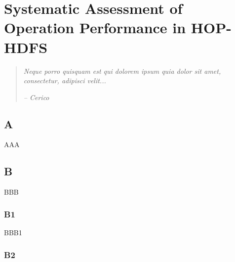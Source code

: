 
%
%
%


\chapter{Systematic Assessment of Operation Performance in HOP-HDFS}
\label{ch:Assessment}

\begin{quotation}
  {\small\it Neque porro quisquam est qui dolorem ipsum quia dolor sit amet, consectetur, adipisci velit...}

{\small\it -- Cerico}
\end{quotation}



\section{A}

AAA


\section{B}

BBB

\subsection{B1}

BBB1

\subsection{B2}

